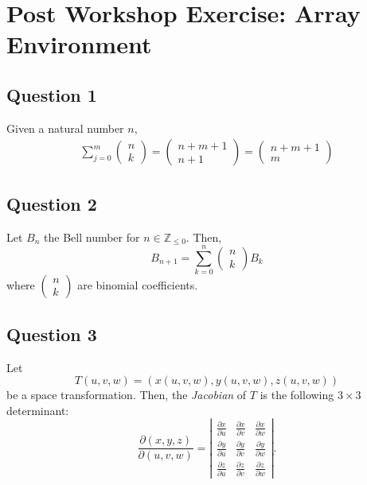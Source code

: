 \documentclass[12pt]{article}
\begin{document}
\section{Post Workshop Exercise: Array Environment}
\subsection{Question 1}
Given a natural number $n$,\begin{align*}
    \sum_{j=0}^m
    \left(
    \begin{array}{c}
        n\\
        k
    \end{array}
    \right)
    =\left(
    \begin{array}{c}
        n+m+1\\
        n+1
    \end{array}
    \right)
    =\left(
    \begin{array}{c}
        n+m+1\\
        m
    \end{array}
    \right)
\end{align*}
\subsection{Question 2}
Let $B_n$ the Bell number for $n\in\mathbb{Z}_{\leq0}$. Then, $$B_{n+1}=\sum_{k=0}^n\left(\begin{array}{c}n\\k\end{array}\right)B_k$$ where $\left(\begin{array}{c}n\\k\end{array}\right)$ are binomial coefficients.
\subsection{Question 3}
Let $$T(u,v,w)=(x(u,v,w),y(u,v,w),z(u,v,w))$$ be a space transformation. Then, the \textit{Jacobian} of $T$ is the following $3\times3$ determinant:$$\frac{\partial(x,y,z)}{\partial(u,v,w)}=\left|\begin{array}{ccc}
    \frac{\partial x}{\partial u} & \frac{\partial x}{\partial v} & \frac{\partial x}{\partial w}\\
    \frac{\partial y}{\partial u} & \frac{\partial y}{\partial v} & \frac{\partial y}{\partial w}\\
    \frac{\partial z}{\partial u} & \frac{\partial z}{\partial v} & \frac{\partial z}{\partial w}
\end{array}\right|.$$
\end{document}
